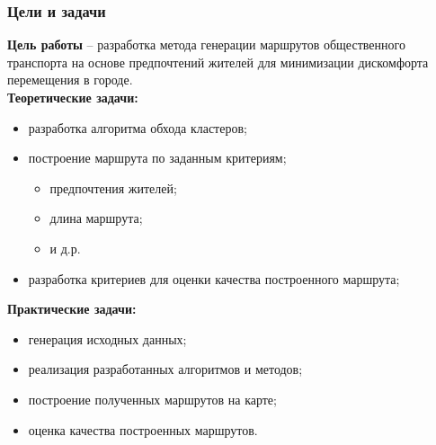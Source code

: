 \begin{frame}
    \frametitle{Цели и задачи}
    \textbf{Цель работы} -- разработка метода генерации маршрутов общественного 
    транспорта на основе предпочтений жителей для минимизации дискомфорта 
    перемещения в городе. \\
    \textbf{Теоретические задачи:}
    \begin{itemize}\itemsep-5pt
        \item разработка алгоритма обхода кластеров;
        \item построение маршрута по заданным критериям;
        \begin{itemize}\itemsep-5pt
            \item предпочтения жителей;
            \item длина маршрута;
            \item и д.р.
        \end{itemize}
        \item разработка критериев для оценки качества построенного маршрута;
    \end{itemize}
    \textbf{Практические задачи:}
    \begin{itemize}\itemsep-5pt
        \item генерация исходных данных;
        \item реализация разработанных алгоритмов и методов;
        \item построение полученных маршрутов на карте;
        \item оценка качества построенных маршрутов.
    \end{itemize}
\end{frame}

